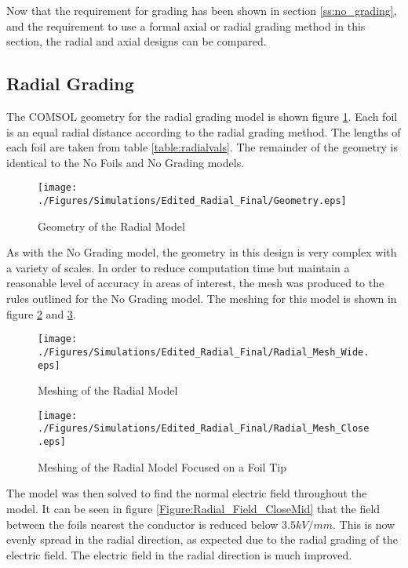 Now that the requirement for grading has been shown in section \ref{ss:no_grading}, and the requirement to use a formal axial or radial grading method in this section, the radial and axial designs can be compared.


\subsection{Radial Grading}
The COMSOL geometry for the radial grading model is shown figure \ref{Figure:Radial_Geom}. 
Each foil is an equal radial distance according to the radial grading method.
The lengths of each foil are taken from table \ref{table:radialvals}.
The remainder of the geometry is identical to the No Foils and No Grading models.

\begin{figure}[!h]
  \centering
    \texttt{[image: ./Figures/Simulations/Edited\_Radial\_Final/Geometry.eps]} 
	\caption{Geometry of the Radial Model}
	\label{Figure:Radial_Geom}
\end{figure}

As with the No Grading model, the geometry in this design is very complex with a variety of scales.
In order to reduce computation time but maintain a reasonable level of accuracy in areas of interest, the mesh was produced to the rules outlined for the No Grading model. The meshing for this model is shown in figure \ref{Figure:Radial_Mesh_wide} and \ref{Figure:Radial_Mesh_close}. 
\begin{figure}[!h]
  \centering
    \texttt{[image: ./Figures/Simulations/Edited\_Radial\_Final/Radial\_Mesh\_Wide.eps]} 
	\caption{Meshing of the Radial Model}
	\label{Figure:Radial_Mesh_wide}
\end{figure}

\begin{figure}[!h]
  \centering
    \texttt{[image: ./Figures/Simulations/Edited\_Radial\_Final/Radial\_Mesh\_Close.eps]} 
	\caption{Meshing of the Radial Model Focused on a Foil Tip}
	\label{Figure:Radial_Mesh_close}
\end{figure}

The model was then solved to find the normal electric field throughout the model.
It can be seen in figure \ref{Figure:Radial_Field_CloseMid} that the field between the foils nearest the conductor is reduced below $3.5kV/mm$.
This is now evenly spread in the radial direction, as expected due to the radial grading of the electric field.
The electric field in the radial direction is much improved.

